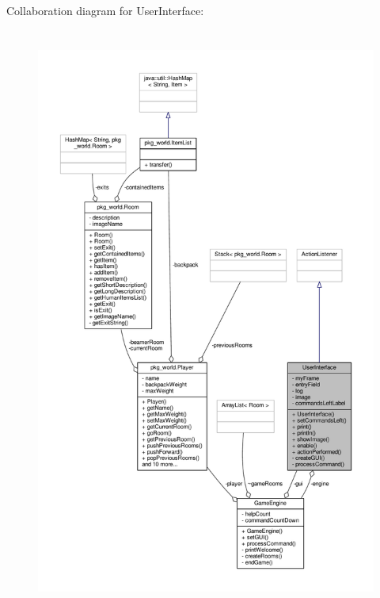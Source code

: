 Collaboration diagram for User\-Interface\-:\nopagebreak
\begin{figure}[H]
\begin{center}
\leavevmode
\includegraphics[height=550pt]{classUserInterface__coll__graph}
\end{center}
\end{figure}
